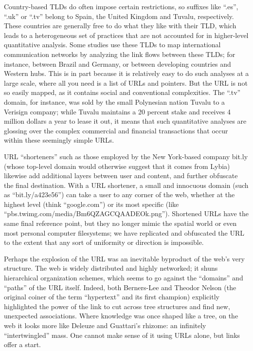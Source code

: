 Country-based TLDs do often impose certain restrictions, so suffixes like ``.es'', ``.uk'' or ``.tv'' belong to Spain, the United Kingdom and Tuvalu, respectively. These countries are generally free to do what they like with their TLD, which leads to a heterogeneous set of practices that are not accounted for in higher-level quantitative analysis. Some studies use these TLDs to map international communication networks by analyzing the link flows between these TLDs; for instance, between Brazil and Germany, or between developing countries and Western hubs.\autocite{park, others} This is in part because it is relatively easy to do such analyses at a large scale, where all you need is a list of URLs and pointers. But the URL is not so easily mapped, as it contains social and conventional complexities. The ``.tv'' domain, for instance, was sold by the small Polynesian nation Tuvalu to a Verisign company; while Tuvalu maintains a 20 percent stake and receives 4 million dollars a year to lease it out, it means that such quantitative analyses are glossing over the complex commercial and financial transactions that occur within these seemingly simple URLs.\autocite{find cite for .tv sale}

URL ``shorteners'' such as those employed by the New York-based company bit.ly (whose top-level domain would otherwise suggest that it comes from Lybia) likewise add additional layers between user and content, and further obfuscate the final destination. With a URL shortener, a small and innocuous domain (such as ``bit.ly/a423e56'') can take a user to any corner of the web, whether at the highest level (think ``google.com'') or its most specific (like ``pbs.twimg.com/media/Bm6QZAGCQAADEOk.png''). Shortened URLs have the same final reference point, but they no longer mimic the spatial world or even most personal computer filesystems; we have replicated and obfuscated the URL to the extent that any sort of uniformity or direction is impossible.\autocite{helmond}


Perhaps the explosion of the URL was an inevitable byproduct of the web's very structure. The web is widely distributed and highly networked; it shuns hierarchical organization schemes, which seems to go against the ``domains'' and ``paths'' of the URL itself. Indeed, both Berners-Lee and Theodor Nelson (the original coiner of the term ``hypertext'' and its first champion) explicitly highlighted the power of the link to cut across tree structures and find new, unexpected associations.\autocite{berners-lee, nelson} Where knowledge was once shaped like a tree, on the web it looks more like Deleuze and Guattari's rhizome: an infinitely ``intertwingled'' mass.\autocite{deleuze, nelson. figure here too?} One cannot make sense of it using URLs alone, but links offer a start.

